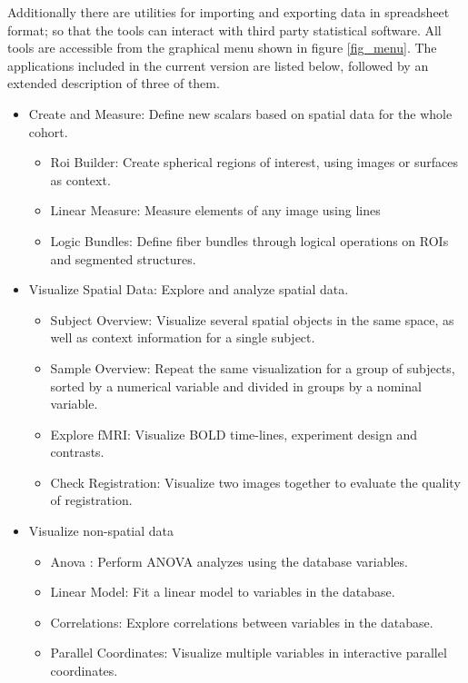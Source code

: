 \documentclass[utf8,paper]{frontiersSCNS} %
\begin{document}
Additionally there are utilities for importing and exporting data in spreadsheet format; so that the tools can interact with third party statistical software. All tools are accessible from the graphical menu shown in figure \ref{fig_menu}. The applications included in the current version are listed below, followed by an extended description of three of them.

\begin{itemize}
\item Create and Measure: Define new scalars based on spatial data for the whole cohort.
\begin{itemize}
\item Roi Builder: Create spherical regions of interest, using images or surfaces as context.
\item Linear Measure: Measure elements of any image using lines
\item Logic Bundles: Define fiber bundles through logical operations on ROIs and segmented structures.
\end{itemize}
\item Visualize Spatial Data: Explore and analyze spatial data.
\begin{itemize}
\item Subject Overview: Visualize several spatial objects in the same space, as well as context information for a single subject.
\item Sample Overview: Repeat the same visualization for a group of subjects, sorted by a numerical variable and divided in groups by a nominal variable.
\item Explore fMRI: Visualize BOLD time-lines, experiment design and contrasts.
\item Check Registration: Visualize two images together to evaluate the quality of registration. 
\end{itemize}
\item Visualize non-spatial data
\begin{itemize}
\item Anova : Perform ANOVA analyzes using the database variables.
\item Linear Model: Fit a linear model to variables in the database.
\item Correlations: Explore correlations between variables in the database.
\item Parallel Coordinates: Visualize multiple variables in interactive parallel coordinates.
\end{itemize}
\end{itemize} 
\end{document}
